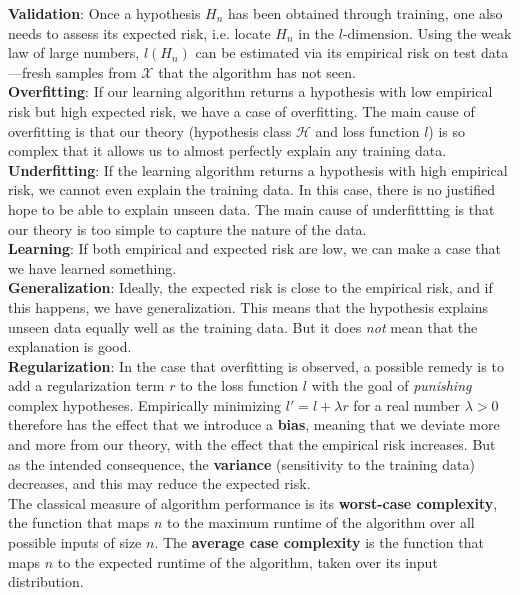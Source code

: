 \textbf{Validation}: Once a hypothesis $H_n$ has been obtained through training, one also needs to assess its expected risk, i.e. locate $H_n$ in the $l$-dimension. Using the weak law of large numbers, $l(H_n)$ can be estimated via its empirical risk on test data—fresh samples from $\mathcal{X}$ that the algorithm has not seen. \\
\textbf{Overfitting}: If our learning algorithm returns a hypothesis with low empirical risk but high expected risk, we have a case of overfitting. The main cause of overfitting is that our theory (hypothesis class $\mathcal{H}$ and loss function $l$) is so complex that it allows us to almost perfectly explain any training data. \\
\textbf{Underfitting}: If the learning algorithm returns a hypothesis with high empirical risk, we cannot even explain the training data. In this case, there is no justified hope to be able to explain unseen data. The main cause of underfittting is that our theory is too simple to capture the nature of the data. \\
\textbf{Learning}: If both empirical and expected risk are low, we can make a case that we have learned something. \\
\textbf{Generalization}: Ideally, the expected risk is close to the empirical risk, and if this happens, we have generalization. This means that the hypothesis explains unseen data equally well as the training data. But it does \textit{not} mean that the explanation is good. \\
\textbf{Regularization}: In the case that overfitting is observed, a possible remedy is to add a regularization term $r$ to the loss function $l$ with the goal of \textit{punishing} complex hypotheses. Empirically minimizing $l' = l + \lambda r$ for a real number $\lambda > 0$ therefore has the effect that we introduce a \textbf{bias}, meaning that we deviate more and more from our theory, with the effect that the empirical risk increases. But as the intended consequence, the \textbf{variance} (sensitivity to the training data) decreases, and this may reduce the expected risk. \\
The classical measure of algorithm performance is its \textbf{worst-case complexity}, the function that maps $n$ to the maximum runtime of the algorithm over all possible inputs of size $n$. The \textbf{average case complexity} is the function that maps $n$ to the expected runtime of the algorithm, taken over its input distribution. \\
